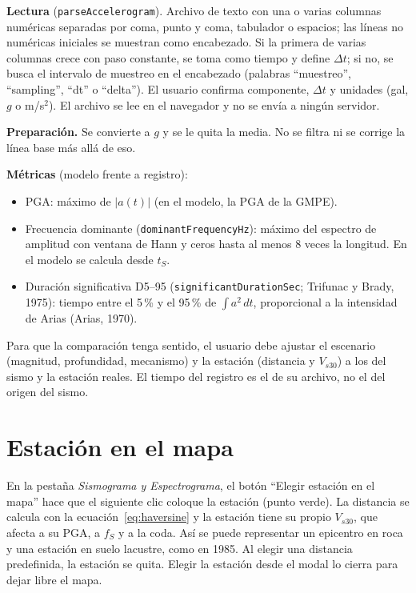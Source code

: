 \documentclass[11pt,a4paper]{article}
\begin{document}
\textbf{Lectura} (\texttt{parseAccelerogram}). Archivo de texto con una o varias columnas numéricas
separadas por coma, punto y coma, tabulador o espacios; las líneas no numéricas iniciales se muestran
como encabezado. Si la primera de varias columnas crece con paso constante, se toma como tiempo y
define $\Delta t$; si no, se busca el intervalo de muestreo en el encabezado (palabras ``muestreo'',
``sampling'', ``dt'' o ``delta''). El usuario confirma componente, $\Delta t$ y unidades (gal, $g$ o
m/s$^2$). El archivo se lee en el navegador y no se envía a ningún servidor.

\textbf{Preparación.} Se convierte a $g$ y se le quita la media. No se filtra ni se corrige la línea
base más allá de eso.

\textbf{Métricas} (modelo frente a registro):
\begin{itemize}
  \item PGA: máximo de $|a(t)|$ (en el modelo, la PGA de la GMPE).
  \item Frecuencia dominante (\texttt{dominantFrequencyHz}): máximo del espectro de amplitud con ventana
        de Hann y ceros hasta al menos 8 veces la longitud. En el modelo se calcula desde $t_S$.
  \item Duración significativa D5--95 (\texttt{significantDurationSec}; Trifunac y Brady, 1975): tiempo
        entre el 5\,\% y el 95\,\% de $\int a^2\,dt$, proporcional a la intensidad de Arias (Arias, 1970).
\end{itemize}
Para que la comparación tenga sentido, el usuario debe ajustar el escenario (magnitud, profundidad,
mecanismo) y la estación (distancia y $V_{s30}$) a los del sismo y la estación reales. El tiempo del
registro es el de su archivo, no el del origen del sismo.

\section{Estación en el mapa}

En la pestaña \emph{Sismograma y Espectrograma}, el botón ``Elegir estación en el mapa'' hace que el
siguiente clic coloque la estación (punto verde). La distancia se calcula con la
ecuación~\eqref{eq:haversine} y la estación tiene su propio $V_{s30}$, que afecta a su PGA, a $f_S$ y a
la coda. Así se puede representar un epicentro en roca y una estación en suelo lacustre, como en 1985.
Al elegir una distancia predefinida, la estación se quita. Elegir la estación desde el modal lo cierra
para dejar libre el mapa.
\end{document}
